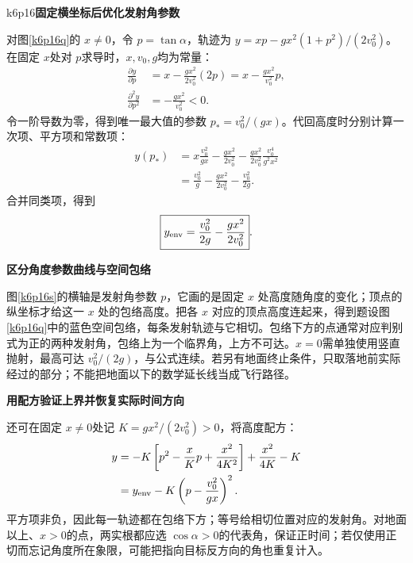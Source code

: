 \begin{drillsolution}{k6p16}\textbf{固定横坐标后优化发射角参数}\par\nobreak
对图\ref{k6p16q}的 $x\ne0$，令 $p=\tan\alpha$，轨迹为 $y=xp-gx^2(1+p^2)/(2v_0^2)$。在固定 $x$处对 $p$求导时，$x,v_0,g$均为常量：
\begin{align*}
 \frac{\partial y}{\partial p}
 &=x-\frac{gx^2}{2v_0^2}(2p)
 =x-\frac{gx^2}{v_0^2}p,\\
 \frac{\partial^2y}{\partial p^2}&=-\frac{gx^2}{v_0^2}<0.
\end{align*}
令一阶导数为零，得到唯一最大值的参数 $p_*=v_0^2/(gx)$。代回高度时分别计算一次项、平方项和常数项：
\begin{align*}
 y(p_*)&=x\frac{v_0^2}{gx}
 -\frac{gx^2}{2v_0^2}
 -\frac{gx^2}{2v_0^2}\frac{v_0^4}{g^2x^2}\\
 &=\frac{v_0^2}{g}-\frac{gx^2}{2v_0^2}-\frac{v_0^2}{2g}.
\end{align*}
合并同类项，得到
\[\boxed{y_{\rm env}=\frac{v_0^2}{2g}-\frac{gx^2}{2v_0^2}}.\]



\par\medskip{}\noindent\textbf{区分角度参数曲线与空间包络}\par\nobreak
图\ref{k6p16s}的横轴是发射角参数 $p$，它画的是固定 $x$ 处高度随角度的变化；顶点的纵坐标才给这一 $x$ 处的包络高度。把各 $x$ 对应的顶点高度连起来，得到题设图\ref{k6p16q}中的蓝色空间包络，每条发射轨迹与它相切。包络下方的点通常对应判别式为正的两种发射角，包络上为一个临界角，上方不可达。$x=0$需单独使用竖直抛射，最高可达 $v_0^2/(2g)$，与公式连续。若另有地面终止条件，只取落地前实际经过的部分；不能把地面以下的数学延长线当成飞行路径。



\par\medskip{}\noindent\textbf{用配方验证上界并恢复实际时间方向}\par\nobreak
还可在固定 $x\ne0$处记 $K=gx^2/(2v_0^2)>0$，将高度配方：
\begin{align*}
 y&=-K\left[p^2-\frac xKp+\frac{x^2}{4K^2}\right]
 +\frac{x^2}{4K}-K\\
 &=y_{\rm env}-K\left(p-\frac{v_0^2}{gx}\right)^2.
\end{align*}
平方项非负，因此每一轨迹都在包络下方；等号给相切位置对应的发射角。对地面以上、$x>0$的点，两实根都应选 $\cos\alpha>0$的代表角，保证正时间；若仅使用正切而忘记角度所在象限，可能把指向目标反方向的角也重复计入。\end{drillsolution}

